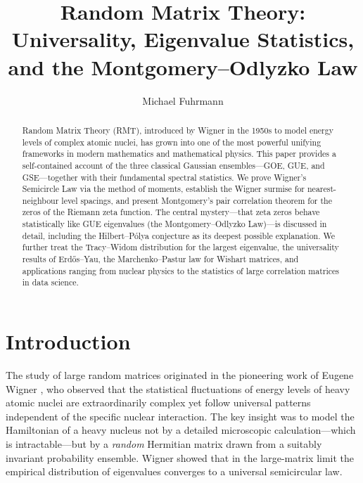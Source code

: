 \documentclass[12pt,a4paper]{amsart}
\author{Michael Fuhrmann}
\theoremstyle{definition}
\theoremstyle{remark}
\begin{document}
\title{Random Matrix Theory: Universality, Eigenvalue Statistics,\\
and the Montgomery--Odlyzko Law}

\begin{abstract}
Random Matrix Theory (RMT), introduced by Wigner in the 1950s to model
energy levels of complex atomic nuclei, has grown into one of the most
powerful unifying frameworks in modern mathematics and mathematical physics.
This paper provides a self-contained account of the three classical Gaussian
ensembles---GOE, GUE, and GSE---together with their fundamental spectral
statistics. We prove Wigner's Semicircle Law via the method of moments,
establish the Wigner surmise for nearest-neighbour level spacings, and present
Montgomery's pair correlation theorem for the zeros of the Riemann zeta
function. The central mystery---that zeta zeros behave statistically like
GUE eigenvalues (the Montgomery--Odlyzko Law)---is discussed in detail,
including the Hilbert--P\'olya conjecture as its deepest possible explanation.
We further treat the Tracy--Widom distribution for the largest eigenvalue,
the universality results of Erd\H{o}s--Yau, the Marchenko--Pastur law for
Wishart matrices, and applications ranging from nuclear physics to
the statistics of large correlation matrices in data science.
\end{abstract}

\maketitle

\tableofcontents

\section{Introduction}

The study of large random matrices originated in the pioneering work of
Eugene Wigner \cite{Wigner1955}, who observed that the statistical
fluctuations of energy levels of heavy atomic nuclei are extraordinarily
complex yet follow universal patterns independent of the specific nuclear
interaction. The key insight was to model the Hamiltonian of a heavy nucleus
not by a detailed microscopic calculation---which is intractable---but by a
\emph{random} Hermitian matrix drawn from a suitably invariant probability
ensemble. Wigner showed that in the large-matrix limit the empirical
distribution of eigenvalues converges to a universal semicircular law.
\end{document}
